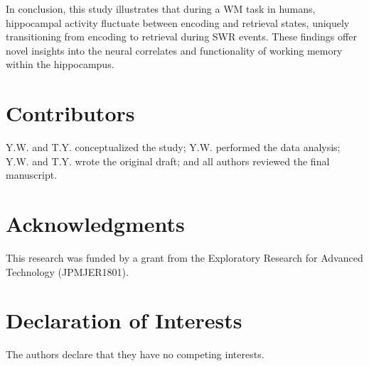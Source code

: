 \documentclass[final,3p,times,twocolumn]{elsarticle}
\begin{document}
In conclusion, this study illustrates that during a WM task in humans, hippocampal activity fluctuate between encoding and retrieval states, uniquely transitioning from encoding to retrieval during SWR events. These findings offer novel insights into the neural correlates and functionality of working memory within the hippocampus.
\label{sec:discussion}





% 

% 




\section*{Contributors}
Y.W. and T.Y. conceptualized the study; Y.W. performed the data analysis; Y.W. and T.Y. wrote the original draft; and all authors reviewed the final manuscript.
\label{contributors}

\section*{Acknowledgments}
This research was funded by a grant from the Exploratory Research for Advanced Technology (JPMJER1801).
\label{acknowledgments}

\section*{Declaration of Interests}
The authors declare that they have no competing interests.
\label{declaration of interests}
\end{document}
